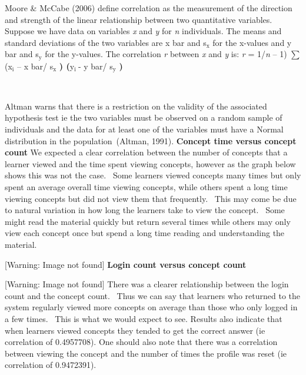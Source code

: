 \documentclass[12pt,twoside]{article}
\newcommand\textsubscript[1]{\ensuremath{{}_{\text{#1}}}}
\begin{document}
Moore \& McCabe (2006) define correlation as the measurement of the
direction and strength of the linear relationship between two
quantitative variables. Suppose we have data on variables \textit{x}
and \textit{y }for \textit{n }individuals. The means and standard
deviations of the two variables are x bar and s\textsubscript{x} for
the x{}-values and y bar and s\textsubscript{y} for the y{}-values. The
correlation \textit{r }between \textit{x} and \textit{y} is: \textit{r}
= 1/\textit{n} {--} 1) ${\sum}$ (x\textsubscript{i} {--} x bar/
s\textsubscript{x} \textbf{) (}y\textsubscript{i }{}- y bar/
s\textsubscript{y} \textbf{)} 

~~ 

Altman warns that there is a restriction on the validity of the
associated hypothesis test ie the two variables must be observed on a
random sample of individuals and the data for at least one of the
variables must have a Normal distribution in the population~(Altman,
1991).\newline
\newline
\textbf{Concept time versus concept count\newline
}We expected a clear correlation between the number of concepts that a
learner viewed and the time spent viewing concepts, however as the
graph below shows this was not the case.~ Some learners viewed concepts
many times but only spent an average overall time viewing concepts,
while others spent a long time viewing concepts but did not view them
that frequently.~ This may come be due to natural variation in how long
the learners take to view the concept.~ Some might read the material
quickly but return several times while others may only view each
concept once but spend a long time reading and understanding the
material.

 [Warning: Image not found] \newline
\textbf{Login count versus concept count}

 [Warning: Image not found]  
\newline
There was a clearer relationship between the login count and the concept
count.~ Thus we can say that learners who returned to the system
regularly viewed more concepts on average than those who only logged in
a few times.~ This is what we would expect to see. Results also
indicate that when learners viewed concepts they tended to get the
correct answer (ie correlation of 0.4957708). One should also note that
there was a correlation between viewing the concept and the number of
times the profile was reset (ie correlation of 0.9472391). 
\end{document}
